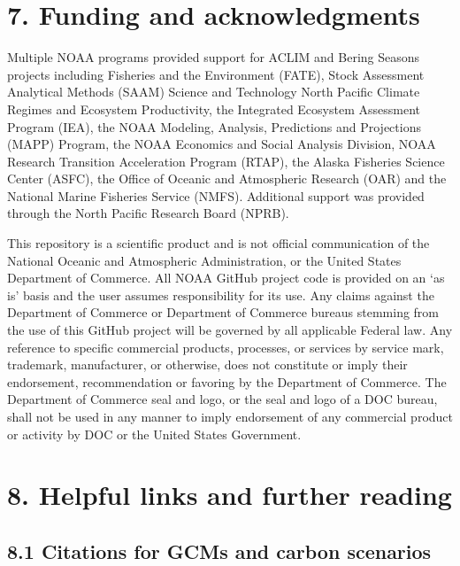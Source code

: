\documentclass[
]{article}
\begin{document}
\hypertarget{funding-and-acknowledgments}{%
\section{7. Funding and
acknowledgments}\label{funding-and-acknowledgments}}

Multiple NOAA programs provided support for ACLIM and Bering Seasons
projects including Fisheries and the Environment (FATE), Stock
Assessment Analytical Methods (SAAM) Science and Technology North
Pacific Climate Regimes and Ecosystem Productivity, the Integrated
Ecosystem Assessment Program (IEA), the NOAA Modeling, Analysis,
Predictions and Projections (MAPP) Program, the NOAA Economics and
Social Analysis Division, NOAA Research Transition Acceleration Program
(RTAP), the Alaska Fisheries Science Center (ASFC), the Office of
Oceanic and Atmospheric Research (OAR) and the National Marine Fisheries
Service (NMFS). Additional support was provided through the North
Pacific Research Board (NPRB).

This repository is a scientific product and is not official
communication of the National Oceanic and Atmospheric Administration, or
the United States Department of Commerce. All NOAA GitHub project code
is provided on an `as is' basis and the user assumes responsibility for
its use. Any claims against the Department of Commerce or Department of
Commerce bureaus stemming from the use of this GitHub project will be
governed by all applicable Federal law. Any reference to specific
commercial products, processes, or services by service mark, trademark,
manufacturer, or otherwise, does not constitute or imply their
endorsement, recommendation or favoring by the Department of Commerce.
The Department of Commerce seal and logo, or the seal and logo of a DOC
bureau, shall not be used in any manner to imply endorsement of any
commercial product or activity by DOC or the United States Government.

\hypertarget{helpful-links-and-further-reading}{%
\section{8. Helpful links and further
reading}\label{helpful-links-and-further-reading}}

\hypertarget{citations-for-gcms-and-carbon-scenarios}{%
\subsection{8.1 Citations for GCMs and carbon
scenarios}\label{citations-for-gcms-and-carbon-scenarios}}
\end{document}
